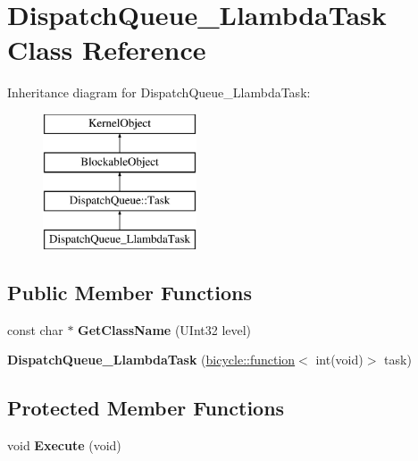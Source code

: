 \hypertarget{class_dispatch_queue___llambda_task}{}\section{Dispatch\+Queue\+\_\+\+Llambda\+Task Class Reference}
\label{class_dispatch_queue___llambda_task}
Inheritance diagram for Dispatch\+Queue\+\_\+\+Llambda\+Task\+:\begin{figure}[H]
\begin{center}
\leavevmode
\includegraphics[height=4.000000cm]{class_dispatch_queue___llambda_task}
\end{center}
\end{figure}
\subsection*{Public Member Functions}
\begin{DoxyCompactItemize}
\item 
\mbox{\label{class_dispatch_queue___llambda_task_a86b7f342ffba4b7ae41609ef5a31596f}} 
const char $\ast$ {\bfseries Get\+Class\+Name} (U\+Int32 level)
\item 
\mbox{\label{class_dispatch_queue___llambda_task_a7dc1f1f6c7a8608d175a2c511046a584}} 
{\bfseries Dispatch\+Queue\+\_\+\+Llambda\+Task} (\hyperlink{classbicycle_1_1function}{bicycle\+::function}$<$ int(void)$>$ task)
\end{DoxyCompactItemize}
\subsection*{Protected Member Functions}
\begin{DoxyCompactItemize}
\item 
\mbox{\label{class_dispatch_queue___llambda_task_a5bb5a09bf0b9b8613bb5cf91b2bc33b8}} 
void {\bfseries Execute} (void)
\end{DoxyCompactItemize}
